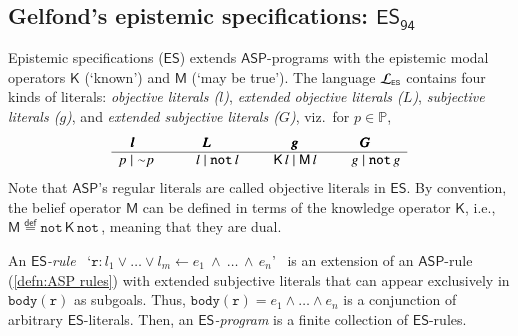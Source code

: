 \documentclass[submission,copyright,creativecommons]{eptcs}
\newcommand{\eqdef}  { \stackrel{\mathsf{def}}{=} }
\newcommand{\lang}[1]  { {\cal L}_{#1} }
\newcommand{\classnot}  { {\sim} }
\newcommand{\Prop}  { \mathbb{P} }
\newcommand{\onequote}[1]  {`#1'}
\newcommand{\logic}[1]  { \ensuremath{\mathsf{#1}} }
\newcommand{\ASP}  { \logic{ASP} }
\newcommand{\ES}  { \logic{ES} }
\newcommand{\lpnot}  { \mathtt{not} \, }
\newcommand{\K}  { \mathsf{K} }
\newcommand{\M}  { \mathsf{M} }
\newcommand{\ESdoksandort}  { \logic{ES_{\scriptscriptstyle{94}} } }
\begin{document}
\subsection{Gelfond's epistemic specifications: 
\texorpdfstring{$\ESdoksandort$}{ESdoksandort}}
\label{sec:ES94}
Epistemic specifications ($\ES$) extends $\ASP$-programs with
the epistemic modal operators 
$\K$ (\onequote{known}) and $\M$ (\onequote{may be true}).
The language $\lang{\scriptscriptstyle{\ES}}$ contains four kinds of literals:
\emph{objective literals ($l$)},
\emph{extended objective literals ($L$)},
\emph{subjective literals ($g$)}, and
\emph{extended subjective literals ($G$)}, viz.\ for $p \in \Prop$,
%
$$
\begin{array}{c c c c}
\pmb{l}   ~~~~ &
\pmb{L}  &
~~~~~~\pmb{g} &
\pmb{G}
\\ \hline 
 p \mid \classnot p ~~   & 
~~~~~~ l \mid \lpnot l       & 
~~~~~~ \K\, l \mid \M\, l  & 
~~~~~~ g \mid \lpnot g
\end{array} 
$$%
%
Note that $\ASP$'s regular literals are called objective literals in $\ES$. 
By convention, the belief operator $\M$ can be defined in terms of the knowledge operator $\K$, i.e., 
$\M \eqdef \lpnot \K \, \lpnot$, meaning that they are dual.

An \emph{$\ES$-rule} \ \onequote{$\mathtt{r} : l_1 \lor  \ldots \lor  l_m \leftarrow e_{1} ~\land~ \ldots \, \land \, e_n$} \  
is an extension of an $\ASP$-rule (\ref{defn:ASP rules}) with extended subjective literals 
that can appear exclusively in $\mathtt{body(r)}$ as subgoals. Thus,
$\mathtt{body(r)} = e_1 \land \ldots \land e_n$ is a conjunction of arbitrary 
$\ES$-literals. 
Then, an \emph{$\ES$-program} is a finite collection of $\ES$-rules.

\end{document}
